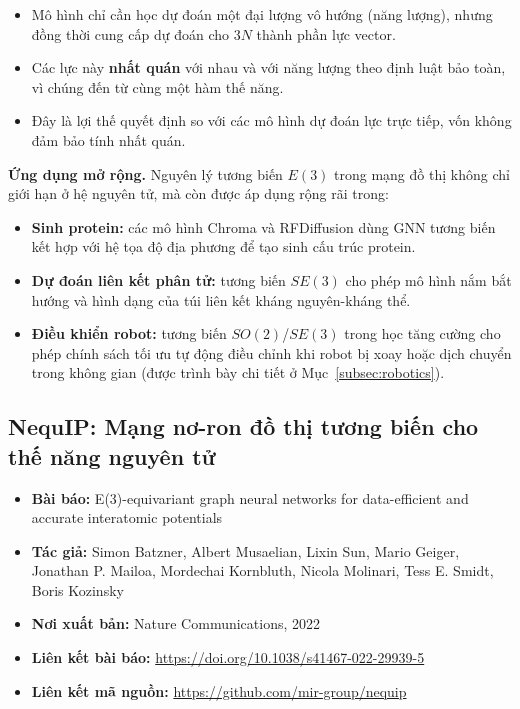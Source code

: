 \begin{itemize}
    \item Mô hình chỉ cần học dự đoán một đại lượng vô hướng (năng lượng), nhưng đồng thời cung cấp dự đoán cho $3N$ thành phần lực vector.
    \item Các lực này \textbf{nhất quán} với nhau và với năng lượng theo định luật bảo toàn, vì chúng đến từ cùng một hàm thế năng.
    \item Đây là lợi thế quyết định so với các mô hình dự đoán lực trực tiếp, vốn không đảm bảo tính nhất quán.
\end{itemize}

\textbf{Ứng dụng mở rộng.} Nguyên lý tương biến $E(3)$ trong mạng đồ thị không chỉ giới hạn ở hệ nguyên tử, mà còn được áp dụng rộng rãi trong:

\begin{itemize}
    \item \textbf{Sinh protein:} các mô hình Chroma và RFDiffusion dùng GNN tương biến kết hợp với hệ tọa độ địa phương để tạo sinh cấu trúc protein.
    \item \textbf{Dự đoán liên kết phân tử:} tương biến $SE(3)$ cho phép mô hình nắm bắt hướng và hình dạng của túi liên kết kháng nguyên-kháng thể.
    \item \textbf{Điều khiển robot:} tương biến $SO(2)$/$SE(3)$ trong học tăng cường cho phép chính sách tối ưu tự động điều chỉnh khi robot bị xoay hoặc dịch chuyển trong không gian (được trình bày chi tiết ở Mục~\ref{subsec:robotics}).
\end{itemize}

\subsection{NequIP: Mạng nơ-ron đồ thị tương biến cho thế năng nguyên tử}
\label{subsec:nequip-paper}

\begin{itemize}
    \item \textbf{Bài báo:} E(3)-equivariant graph neural networks for data-efficient and accurate interatomic potentials
    \item \textbf{Tác giả:} Simon Batzner, Albert Musaelian, Lixin Sun, Mario Geiger, Jonathan P. Mailoa, Mordechai Kornbluth, Nicola Molinari, Tess E. Smidt, Boris Kozinsky
    \item \textbf{Nơi xuất bản:} Nature Communications, 2022
    \item \textbf{Liên kết bài báo:} \url{https://doi.org/10.1038/s41467-022-29939-5}
    \item \textbf{Liên kết mã nguồn:} \url{https://github.com/mir-group/nequip}
\end{itemize}

